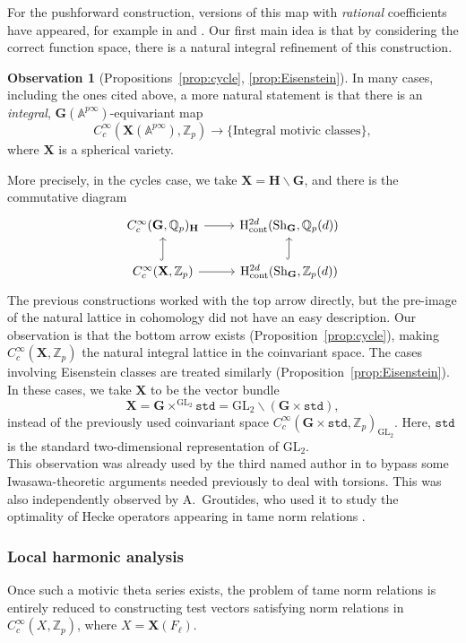 \documentclass{amsart}
\theoremstyle{definition}
\theoremstyle{remark}
\newcommand{\1}{\mathbf{1}}
\newcommand{\A}{\mathbb{A}}
\newcommand{\cont}{\mathrm{cont}}
\newcommand{\GL}{\mathrm{GL}}
\newcommand{\h}{\mathrm{H}}
\newcommand{\mb}[1]{\mathbf{#1}}
\newcommand{\Q}{\mathbb{Q}}
\newcommand{\Z}{\mathbb{Z}}
\theoremstyle{definition}
\newtheorem{observation}[theorem]{Observation}
\newcommand{\bG}{\mathbf{G}}
\newcommand{\Sh}{\mathrm{Sh}}
\begin{document}
For the pushforward construction, versions of this map with \emph{rational} coefficients have appeared, for example in \cite[Definition 9.2.3]{LSZ-U3} and \cite[Proposition 9.14]{GrahamShah}. Our first main idea is that by considering the correct function space, there is a natural integral refinement of this construction.
\begin{observation}[Propositions~\ref{prop:cycle}, \ref{prop:Eisenstein}]
    In many cases, including the ones cited above, a more natural statement is that there is an \emph{integral}, $\mb{G}(\A^{p\infty})$-equivariant map
\[
    C_c^\infty(\mb{X}(\A^{p\infty}),\Z_p)\to\{\text{Integral motivic classes}\},
\]
where $\mb{X}$ is a spherical variety.
\end{observation}
\noindent More precisely, in the cycles case, we take $\mb{X}=\mb{H}\backslash\mb{G}$, and there is the commutative diagram
\[
\begin{tikzcd}
    C_c^\infty(\bG,\Q_p)_{\mb{H}}\rar & \h_\cont^{2d}(\Sh_\bG,\Q_p(d))\\
    C_c^\infty(\mb{X},\Z_p)\uar[hook]\rar & \h_\cont^{2d}(\Sh_\bG,\Z_p(d))\uar[hook]
\end{tikzcd}
\]
The previous constructions worked with the top arrow directly, but the pre-image of the natural lattice in cohomology did not have an easy description. Our observation is that the bottom arrow exists (Proposition~\ref{prop:cycle}), making $C_c^\infty(\mb{X},\Z_p)$ the natural integral lattice in the coinvariant space. The cases involving Eisenstein classes are treated similarly (Proposition~\ref{prop:Eisenstein}). In these cases, we take $\mb{X}$ to be the vector bundle
\[
    \mb{X}=\mb{G}\times^{\GL_2}\mathtt{std}=\GL_2\backslash(\mb{G}\times\mathtt{std}),
\]
instead of the previously used coinvariant space $C_c^\infty(\mb{G}\times\mathtt{std},\Z_p)_{\GL_2}$. Here, $\mathtt{std}$ is the standard two-dimensional representation of $\GL_2$.\\

This observation was already used by the third named author in \cite{LaiSkinner} to bypass some Iwasawa-theoretic arguments needed previously to deal with torsions. This was also independently observed by A.~Groutides, who used it to study the optimality of Hecke operators appearing in tame norm relations \cite{GroutidesRS}.

\subsubsection{Local harmonic analysis}
Once such a motivic theta series exists, the problem of tame norm relations is entirely reduced to constructing test vectors satisfying norm relations in $C_c^\infty(X,\Z_p)$, where $X=\mb{X}(F_\ell)$.
\end{document}
